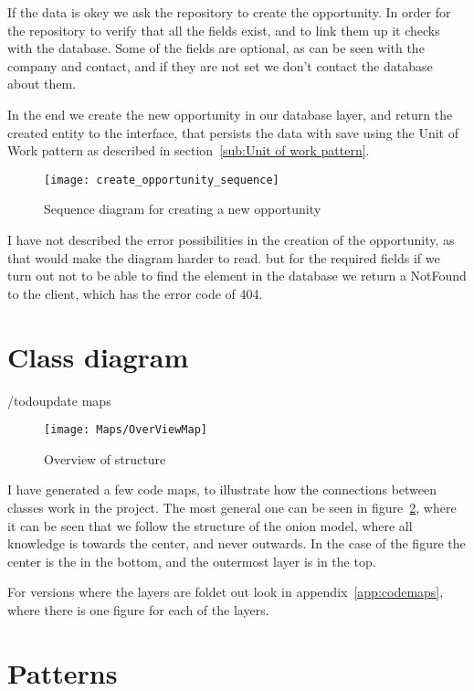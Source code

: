 If the data is okey we ask the repository to create the opportunity. In order
for the repository to verify that all the fields exist, and to link them up it
checks with the database. Some of the fields are optional, as can be seen with
the company and contact, and if they are not set we don't contact the database
about them.

In the end we create the new opportunity in our database layer, and return the
created entity to the interface, that persists the data with save using the Unit
of Work pattern as described in section~\ref{sub:Unit of work pattern}.

\begin{figure}[!htb]
  \centering
  \texttt{[image: create\_opportunity\_sequence]}
  \caption{Sequence diagram for creating a new opportunity}
  \label{fig:opportunity_sequence}
\end{figure}

I have not described the error possibilities in the creation of the opportunity,
as that would make the diagram harder to read. but for the required fields if we
turn out not to be able to find the element in the database we return a NotFound
to the client, which has the error code of 404.

\section{Class diagram}
\label{sec:class_diagram}
/todo{update maps}
\begin{figure}[h]
  \centering
  \texttt{[image: Maps/OverViewMap]}
  \caption{Overview of structure}
  \label{fig:overviewMap}
\end{figure}

I have generated a few code maps, to illustrate how the connections between
classes work in the project. The most general one can be seen in
figure~\ref{fig:overviewMap}, where it can be seen that we follow the structure
of the onion model, where all knowledge is towards the center, and never
outwards. In the case of the figure the center is the in the bottom, and the
outermost layer is in the top.

For versions where the layers are foldet out look in
appendix~\ref{app:codemaps}, where there is one figure for each of the layers.

\section{Patterns}
\label{sec:Patterns}

